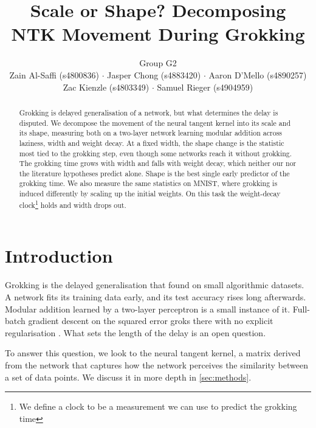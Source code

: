 \documentclass[a4paper,11pt]{article} %
\begin{document}
\title{Scale or Shape? Decomposing NTK Movement During Grokking}
\author{Group G2 \\
  Zain Al-Saffi (s4800836) $\cdot$
  Jasper Chong (s4883420) $\cdot$
  Aaron D'Mello (s4890257) \\
Zac Kienzle (s4803349) $\cdot$ Samuel Rieger (s4904959)}

\date{}
\maketitle

\begin{abstract}
  Grokking is delayed generalisation of a network, but what determines
  the delay is disputed. We decompose the movement of the neural tangent
  kernel into its scale and its shape, measuring both on a two-layer network
  learning modular addition across laziness, width and weight decay. At a
  fixed width, the shape change is the statistic most tied to the grokking
  step, even though some networks reach it without grokking. The grokking
  time grows with width and falls with weight decay, which neither our nor the literature hypotheses predict alone. 
  Shape is the
  best single early predictor of the grokking time. We also measure the same
  statistics on MNIST, where grokking is induced differently by
  scaling up the initial weights. On this task the weight-decay clock\footnote{We define a clock to be a measurement we can use to predict the grokking time} holds
  and width drops out.
\end{abstract}

\section{Introduction}

Grokking is the delayed generalisation that
\citet{powerGrokkingGeneralizationOverfitting2022} found on small algorithmic
datasets. A network fits its training data early, and its test
accuracy rises long
afterwards. Modular addition learned by a two-layer perceptron
is a small instance of it. Full-batch gradient descent on the squared error
groks there with no explicit regularisation
\citep{gromovGrokkingModularArithmetic2023}. What sets the length of the delay
is an open question.

To answer this question, we look to the neural tangent kernel, a matrix derived from the network that captures how the network perceives the similarity between a set of data points. We discuss it in more depth in \ref{sec:methods}.
\end{document}
